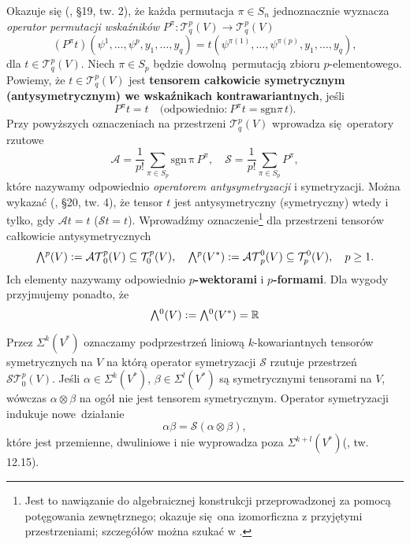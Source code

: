 Okazuje się (\cite{herdegen}, §19, tw. 2), że każda permutacja \(\pi\in S_n\) jednoznacznie wyznacza \emph{operator permutacji wskaźników} \(P^{\pi}:\mathcal{T}_q^p(V)\to\mathcal{T}_q^p(V)\)
\begin{equation*}
    (P^\pi t)(\psi^1, \dots, \psi^p, y_1, \dots, y_q) = t(\psi^{\pi(1)}, \dots, \psi^{\pi(p)}, y_1, \dots, y_q),
\end{equation*} dla \(t\in\mathcal{T}_q^p(V)\). Niech \(\pi\in S_p\) będzie dowolną permutacją zbioru \(p\)-elementowego. Powiemy, że \(t\in\mathcal{T}_q^p(V)\) jest \textbf{tensorem całkowicie symetrycznym (antysymetrycznym) we wskaźnikach kontrawariantnych}, jeśli 
\begin{equation*}
    P^\pi t = t\quad \text{(odpowiednio:}\ P^\pi t = \mathrm{sgn}\pi\, t\text{)}. 
\end{equation*}
Przy powyższych oznaczeniach na przestrzeni \(\mathcal{T}_q^p(V)\) wprowadza się operatory rzutowe
\begin{equation*}
    \mathcal{A}=\frac{1}{p!}\sum_{\pi\in S_p} \mathrm{sgn\,\pi}\,P^\pi,\quad \mathcal{S}=\frac{1}{p!}\sum_{\pi\in S_p} P^\pi,
\end{equation*}
które nazywamy odpowiednio \emph{operatorem antysymetryzacji} i symetryzacji. Można wykazać (\cite{herdegen}, §20, tw. 4), że tensor \(t\) jest antysymetryczny (symetryczny) wtedy i tylko, gdy \(\mathcal{A}t = t\)  (\(\mathcal{S}t = t\)). Wprowadźmy oznaczenie\footnote{Jest to nawiązanie do algebraicznej konstrukcji przeprowadzonej za pomocą potęgowania zewnętrznego; okazuje się ona izomorficzna z przyjętymi przestrzeniami; szczegółów można szukać w \cite{maurin2}.} dla przestrzeni tensorów całkowicie antysymetrycznych
\begin{align*}
    \Exterior^p(V):=\mathcal{AT}^p_0(V)\subseteq \mathcal{T}^p_0(V),\quad \Exterior^p(V^\ast):=\mathcal{AT}^0_p(V)\subseteq\mathcal{T}^0_p(V), \quad p\geq 1.
\end{align*}
Ich elementy nazywamy odpowiednio \textbf{\(p\)-wektorami} i \textbf{\(p\)-formami}. Dla wygody przyjmujemy ponadto, że
\begin{equation*}
     \Exterior^0(V):=\Exterior^0(V^\ast)=\R
\end{equation*}

Przez \(\Sigma^k(V^{\ast})\) oznaczamy podprzestrzeń liniową \(k\)-kowariantnych tensorów symetrycznych na \(V\) na którą operator symetryzacji \(\mathcal{S}\) rzutuje przestrzeń \(\mathcal{ST}^p_0(V)\). Jeśli \(\alpha\in\Sigma^k(V^{\ast})\), \(\beta\in\Sigma^l(V^{\ast})\) są symetrycznymi tensorami na \(V\), wówczas \(\alpha\otimes\beta\) na ogół nie jest tensorem symetrycznym. Operator symetryzacji indukuje nowe działanie 
\begin{equation*}
    \alpha\beta = \mathcal{S}(\alpha\otimes\beta),
\end{equation*}
które jest przemienne, dwuliniowe i nie wyprowadza poza \(\Sigma^{k+l}(V^{\ast})\)(\cite{lee}, tw. 12.15).

